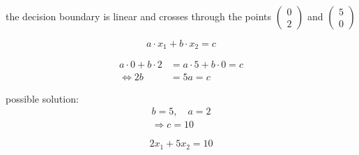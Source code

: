 the decision boundary is linear and crosses through the points $\begin{pmatrix} 0 \\ 2 \end{pmatrix}$ and $\begin{pmatrix} 5 \\ 0 \end{pmatrix}$

\[ a \cdot x_1 + b \cdot x_2 = c \]

\begin{align*}
a \cdot 0 + b \cdot 2 &= a \cdot 5 + b \cdot 0 = c \\
\Leftrightarrow 2b &= 5a = c
\end{align*}

possible solution:
\begin{align*}
b = 5, \quad a = 2 \\
\Rightarrow c = 10
\end{align*}

\[ 2 x_1 + 5 x_2 = 10 \]

